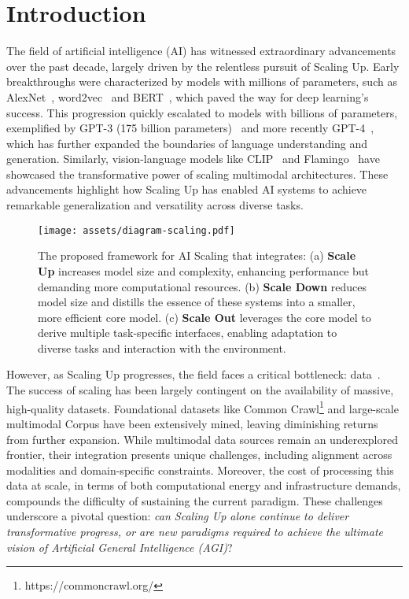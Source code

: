 \section{Introduction}
The field of artificial intelligence (AI) has witnessed extraordinary advancements over the past decade, largely driven by the relentless pursuit of Scaling Up. Early breakthroughs were characterized by models with millions of parameters, such as AlexNet~\cite{krizhevsky2012imagenet}, word2vec~\cite{church2017word2vec} and BERT~\cite{devlin2018bert}, which paved the way for deep learning's success. This progression quickly escalated to models with billions of parameters, exemplified by GPT-3 (175 billion parameters)~\cite{brown2020language} and more recently GPT-4~\cite{achiam2023gpt}, which has further expanded the boundaries of language understanding and generation. Similarly, vision-language models like CLIP~\cite{radford2021learning} and Flamingo~\cite{alayrac2022flamingo} have showcased the transformative power of scaling multimodal architectures. These advancements highlight how Scaling Up has enabled AI systems to achieve remarkable generalization and versatility across diverse tasks.

\begin{figure}[!tbp]
    \centering
    \texttt{[image: assets/diagram-scaling.pdf]}
    \vspace{-1em}
    \caption{The proposed framework for AI Scaling that integrates: (a) \textbf{Scale Up} increases model size and complexity, enhancing performance but demanding more computational resources. (b) \textbf{Scale Down} reduces model size and distills the essence of these systems into a smaller, more efficient core model. (c) \textbf{Scale Out} leverages the core model to derive multiple task-specific interfaces, enabling adaptation to diverse tasks and interaction with the environment.}
    \vspace{-1em}
    \label{fig:scaling-diagram}
\end{figure}

However, as Scaling Up progresses, the field faces a critical bottleneck: data~\cite{shumailov2024ai}. The success of scaling has been largely contingent on the availability of massive, high-quality datasets. Foundational datasets like Common Crawl\footnote{https://commoncrawl.org/} and large-scale multimodal Corpus have been extensively mined, leaving diminishing returns from further expansion. While multimodal data sources remain an underexplored frontier, their integration presents unique challenges, including alignment across modalities and domain-specific constraints. Moreover, the cost of processing this data at scale, in terms of both computational energy and infrastructure demands, compounds the difficulty of sustaining the current paradigm. These challenges underscore a pivotal question: \textit{can Scaling Up alone continue to deliver transformative progress, or are new paradigms required to achieve the ultimate vision of Artificial General Intelligence (AGI)}?


